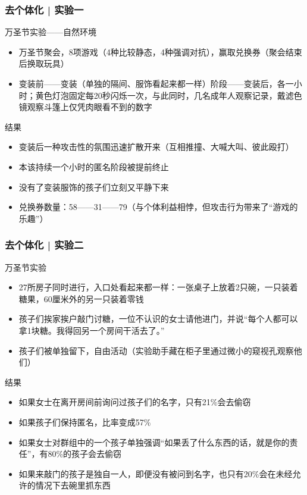\begin{frame}
  \frametitle{去个体化 | 实验一}
  \begin{block}{万圣节实验——自然环境}
    \begin{itemize}
      \item 万圣节聚会，8项游戏（4种比较静态，4种强调对抗），赢取兑换券（聚会结束后换取玩具）
      \item 变装前——变装（单独的隔间、服饰看起来都一样）阶段——变装后，各一小时；黄色灯泡固定每20秒闪烁一次，与此同时，几名成年人观察记录，戴滤色镜观察斗篷上仅凭肉眼看不到的数字
    \end{itemize}
  \end{block}
  \pause
  \begin{block}{结果}
    \begin{itemize}
      \item 变装后一种攻击性的氛围迅速扩散开来（互相推撞、大喊大叫、彼此殴打）
      \item 本该持续一个小时的匿名阶段被提前终止
      \item 没有了变装服饰的孩子们立刻又平静下来
      \item 兑换券数量：58——31——79（与个体利益相悖，但攻击行为带来了“游戏的乐趣”）
    \end{itemize}
  \end{block}
\end{frame}

\begin{frame}
  \frametitle{去个体化 | 实验二}
  \begin{block}{万圣节实验}
    \begin{itemize}
      \item 27所房子同时进行，入口处看起来都一样：一张桌子上放着2只碗，一只装着糖果，60厘米外的另一只装着零钱
      \item 孩子们挨家挨户敲门讨糖，一位不认识的女士请他进门，并说“每个人都可以拿1块糖。我得回另一个房间干活去了。”
      \item 孩子们被单独留下，自由活动（实验助手藏在柜子里通过微小的窥视孔观察他们）
    \end{itemize}
  \end{block}
  \vspace{-0.5em}
  \pause
  \begin{block}{结果}
    \begin{itemize}
      \item 如果女士在离开房间前询问过孩子们的名字，只有21\%会去偷窃
      \item 如果孩子们保持匿名，比率变成57\%
      \item 如果女士对群组中的一个孩子单独强调“如果丢了什么东西的话，就是你的责任”，有80\%的孩子会去偷窃
      \item 如果来敲门的孩子是独自一人，即便没有被问到名字，也只有20\%会在未经允许的情况下去碗里抓东西
    \end{itemize}
  \end{block}
\end{frame}

